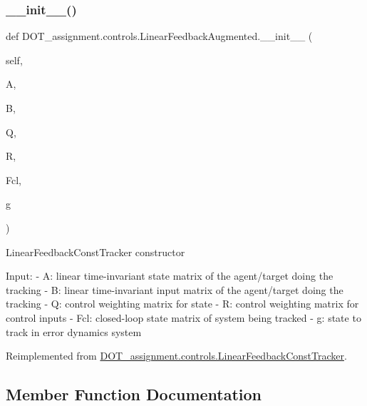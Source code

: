 \subsubsection{\texorpdfstring{\_\_init\_\_()}{\_\_init\_\_()}}
{\footnotesize\ttfamily def D\+O\+T\+\_\+assignment.\+controls.\+Linear\+Feedback\+Augmented.\+\_\+\+\_\+init\+\_\+\+\_\+ (\begin{DoxyParamCaption}\item[{}]{self,  }\item[{}]{A,  }\item[{}]{B,  }\item[{}]{Q,  }\item[{}]{R,  }\item[{}]{Fcl,  }\item[{}]{g }\end{DoxyParamCaption})}

\begin{DoxyVerb}LinearFeedbackConstTracker constructor

Input:
- A:            linear time-invariant state matrix of the agent/target doing the tracking
- B:            linear time-invariant input matrix of the agent/target doing the tracking
- Q:            control weighting matrix for state
- R:            control weighting matrix for control inputs
- Fcl:          closed-loop state matrix of system being tracked
- g:            state to track in error dynamics system\end{DoxyVerb}
 

Reimplemented from \mbox{\hyperlink{class_d_o_t__assignment_1_1controls_1_1_linear_feedback_const_tracker_a5673a5219e7675de2bf80ea945aa33f1}{D\+O\+T\+\_\+assignment.\+controls.\+Linear\+Feedback\+Const\+Tracker}}.



\subsection{Member Function Documentation}
\mbox{\label{class_d_o_t__assignment_1_1controls_1_1_linear_feedback_augmented_ab0ec1f6c8ba4ea11ce15eb4b88c54675}} 
